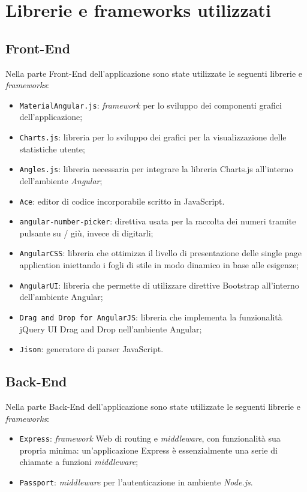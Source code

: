 \newpage
\section{Librerie e frameworks utilizzati}
\subsection{Front-End}
Nella parte Front-End dell'applicazione sono state utilizzate le seguenti librerie e \textit{frameworks}:
\begin{itemize}
	\item \texttt{MaterialAngular.js}: \textit{framework} per lo sviluppo dei componenti grafici dell'applicazione;
	\item \texttt{Charts.js}: libreria per lo sviluppo dei grafici per la visualizzazione delle statistiche
	utente;
	\item \texttt{Angles.js}: libreria necessaria per integrare la libreria Charts.js all'interno
	dell'ambiente \textit{Angular};
	\item \texttt{Ace}: editor di codice incorporabile scritto in JavaScript.
	\item
	\texttt{angular-number-picker}: direttiva usata per la raccolta dei numeri tramite pulsante su / giù, invece di digitarli;
	\item
	\texttt{AngularCSS}: libreria che ottimizza il livello di presentazione delle single page application iniettando i fogli di stile in modo dinamico in base alle esigenze;
	\item 
	\texttt{AngularUI}: libreria che permette di utilizzare direttive Bootstrap all'interno dell'ambiente Angular;
	\item
	\texttt{Drag and Drop for AngularJS}: libreria che implementa la funzionalità jQuery UI Drag and Drop nell'ambiente Angular;
	\item \texttt{Jison}: generatore di parser JavaScript.
\end{itemize}
\subsection{Back-End}
Nella parte Back-End dell'applicazione sono state utilizzate le seguenti librerie e \textit{frameworks}:
\begin{itemize}
	\item \texttt{Express}: \textit{framework} Web di routing e \textit{middleware}, con funzionalità sua propria minima: un'applicazione Express è essenzialmente una serie di chiamate a funzioni \textit{middleware};
	\item \texttt{Passport}: \textit{middleware} per l'autenticazione in ambiente \textit{Node.js}.
\end{itemize}
